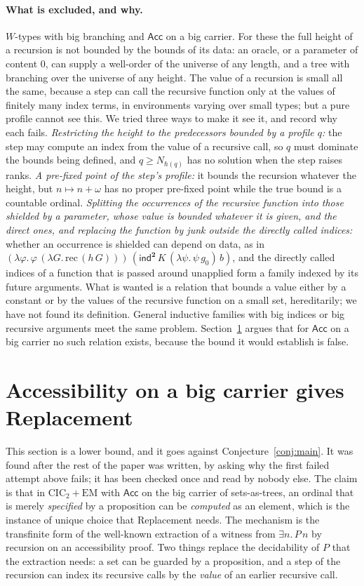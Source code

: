 \documentclass[10pt]{article}
\newcommand{\CIC}{\mathrm{CIC}}
\newcommand{\EM}{\mathrm{EM}}
\newcommand{\ind}{\mathsf{ind}}
\newcommand{\Acc}{\mathsf{Acc}}
\begin{document}
\paragraph{What is excluded, and why.}
$W$-types with big branching and $\Acc$ on a big carrier. For these the
full height of a recursion is not bounded by the bounds of its data: an
oracle, or a parameter of content $0$, can supply a well-order of the
universe of any length, and a tree with branching over the universe of
any height. The value of a recursion is small all the same, because a
step can call the recursive function only at the values of finitely
many index terms, in environments varying over small types; but a pure
profile cannot see this. We tried three ways to make it see it, and
record why each fails. \emph{Restricting the height to the predecessors
bounded by a profile $q$:} the step may compute an index from the value
of a recursive call, so $q$ must dominate the bounds being defined, and
$q\ge N_{\hbar(q)}$ has no solution when the step raises ranks.
\emph{A pre-fixed point of the step's profile:} it bounds the recursion
whatever the height, but $n\mapsto n+\omega$ has no proper pre-fixed point
while the true bound is a countable ordinal. \emph{Splitting the
occurrences of the recursive function into those shielded by a
parameter, whose value is bounded whatever it is given, and the direct
ones, and replacing the function by junk outside the directly called
indices:} whether an occurrence is shielded can depend on data, as in
$(\lambda\varphi.\,\varphi\,(\lambda G.\,\mathrm{rec}\,(h\,G)))\,(\ind^{\mathbf 2}\,K\,(\lambda\psi.\,\psi\,g_0)\,b)$,
and the directly called indices of a function that is passed around
unapplied form a family indexed by its future arguments. What is wanted
is a relation that bounds a value either by a constant or by the values
of the recursive function on a small set, hereditarily; we have not
found its definition. General inductive families with big indices or big
recursive arguments meet the same problem. Section~\ref{sec:bigacc}
argues that for $\Acc$ on a big carrier no such relation exists, because
the bound it would establish is false.

\section{Accessibility on a big carrier gives Replacement}\label{sec:bigacc}

This section is a lower bound, and it goes against
Conjecture~\ref{conj:main}. It was found after the rest of the paper
was written, by asking why the first failed attempt above fails; it has
been checked once and read by nobody else. The claim is that in
$\CIC_2+\EM$ with $\Acc$ on the big carrier of sets-as-trees, an ordinal
that is merely \emph{specified} by a proposition can be \emph{computed}
as an element, which is the instance of unique choice that Replacement
needs. The mechanism is the transfinite form of the well-known
extraction of a witness from $\exists n.\,P\,n$ by recursion on an
accessibility proof. Two things replace the decidability of $P$ that the
extraction needs: a set can be guarded by a proposition, and a step of
the recursion can index its recursive calls by the \emph{value} of an
earlier recursive call.
\end{document}
